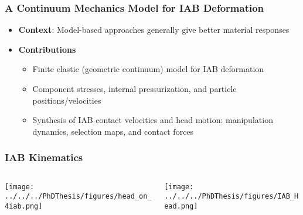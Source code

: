 \begin{frame}
\frametitle{A Continuum Mechanics Model for IAB Deformation}
\begin{itemize}
	\item \textbf{Context}: Model-based approaches generally give better material responses
	\vspace{0.1in}
	\item \textbf{Contributions}
	
	\begin{itemize}
		\item Finite elastic (geometric continuum)  model for IAB deformation
		\vspace{0.1in}
		\item Component stresses, internal pressurization, and particle positions/velocities
		\vspace{0.1in}
		\item Synthesis of IAB contact velocities and head motion: manipulation dynamics, selection maps, and contact forces
	\end{itemize}
\end{itemize}
\end{frame}

\begin{frame}
\frametitle{IAB Kinematics}
\centering 
	\begin{columns}[c]
	\begin{column}{.5\textwidth}
		\texttt{[image: ../../../PhDThesis/figures/head\_on\_4iab.png]}
	\end{column}
	\begin{column}{.5\textwidth}
		\-
		\hspace{0.25em}
		\texttt{[image: ../../../PhDThesis/figures/IAB\_Head.png]}
	\end{column}
\end{columns}
\end{frame}

